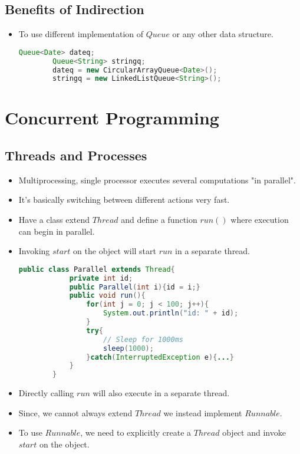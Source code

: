 \documentclass[a4paper]{article}
\begin{document}
\subsection{Benefits of Indirection}
\begin{itemize}
    \item To use different implementation of $Queue$ or any other data structure.
    \begin{lstlisting}[language=Java]
        Queue<Date> dateq;
        Queue<String> stringq;
        dateq = new CircularArrayQueue<Date>();
        stringq = new LinkedListQueue<String>();
    \end{lstlisting}
\end{itemize}

\section{Concurrent Programming}
\subsection{Threads and Processes}
\begin{itemize}
    \item Multiprocessing, single processor executes several computations "in parallel".
    \item It's basically switching between different actions very fast.
    \item Have a class extend $Thread$ and define a function $run()$ where execution can begin in parallel.
    \item Invoking $start$ on the object will start $run$ in a separate thread.
    \begin{lstlisting}[language=Java]
        public class Parallel extends Thread{
            private int id;
            public Parallel(int i){id = i;}
            public void run(){
                for(int j = 0; j < 100; j++){
                    System.out.println("id: " + id);
                }
                try{
                    // Sleep for 1000ms
                    sleep(1000);
                }catch(InterruptedException e){...}
            }
        }
    \end{lstlisting}
    \item Directly calling $run$ will also execute in a separate thread.
    \item Since, we cannot always extend $Thread$ we instead implement $Runnable$.
    \item To use $Runnable$, we need to explicitly create a $Thread$ object and invoke $start$ on the object.
\end{itemize}
\end{document}
